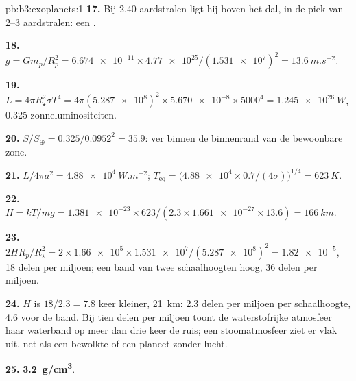 \begin{solution}{pb:b3:exoplanets:1}
\textbf{17.} Bij 2.40 aardstralen ligt hij boven het dal, in de piek van 2--3 aardstralen:
een .

\textbf{18.} $g = Gm_p/R_p^2 = \num{6.674e-11}\times\num{4.77e25}/(\num{1.531e7})^2 =
\qty{13.6}{m.s^{-2}}$.

\textbf{19.} $L = 4\pi R_\star^2\sigma T^4 = 4\pi(\num{5.287e8})^2\times\num{5.670e-8}
\times5000^4 = \qty{1.245e26}{W}$, 0.325 zonneluminositeiten.

\textbf{20.} $S/S_\oplus = 0.325/0.0952^2 = 35.9$: ver binnen de binnenrand van de
bewoonbare zone.

\textbf{21.} $L/4\pi a^2 = \qty{4.88e4}{W.m^{-2}}$; $T_\mathrm{eq} =
\bigl(\num{4.88e4}\times0.7/(4\sigma)\bigr)^{1/4} = \qty{623}{K}$.

\textbf{22.} $H = kT/\bar m g = \num{1.381e-23}\times623/(2.3\times\num{1.661e-27}
\times13.6) = \qty{166}{km}$.

\textbf{23.} $2HR_p/R_\star^2 = 2\times\num{1.66e5}\times\num{1.531e7}/
(\num{5.287e8})^2 = \num{1.82e-5}$, 18 delen per miljoen; een band van twee
schaalhoogten hoog, 36 delen per miljoen.

\textbf{24.} $H$ is $18/2.3 = 7.8$ keer kleiner, \qty{21}{km}: 2.3 delen per
miljoen per schaalhoogte, 4.6 voor de band. Bij tien delen per miljoen toont de
waterstofrijke atmosfeer haar waterband op meer dan drie keer de
ruis; een stoomatmosfeer ziet er vlak uit, net als een bewolkte of een planeet
zonder lucht.

\textbf{25.} \textbf{\qty[text-series-to-math=true]{3.2}{g/cm^3}}.
\end{solution}
